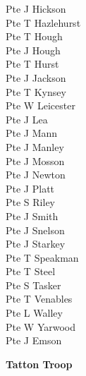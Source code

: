 \begin{multicols}{2}
  Pte J Hickson \\
  Pte T Hazlehurst \\
  Pte T Hough \\
  Pte J Hough \\
  Pte T Hurst \\
  Pte J Jackson \\
  Pte T Kynsey \\
  Pte W Leicester \\
  Pte J Lea \\
  Pte J Mann \\
  Pte J Manley \\
  Pte J Mosson \\
  Pte J Newton \\
  Pte J Platt \\
  Pte S Riley \\
  Pte J Smith \\
  Pte J Snelson \\
  Pte J Starkey \\
  Pte T Speakman \\
  Pte T Steel \\
  Pte S Tasker \\
  Pte T Venables \\
  Pte L Walley \\
  Pte W Yarwood \\
  Pte J Emson \\
\end{multicols}

\begin{center}
  \Large
  \textbf{Tatton Troop}
\end{center}

